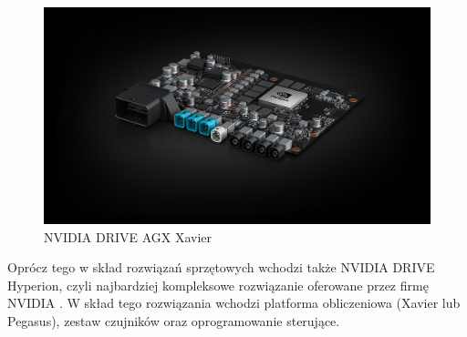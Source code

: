 \begin{enumerate*}
\begin{figure}[h]
\begin{center}
\includegraphics[width=15cm]{resources/figures/nv-drive-xavier.jpg}
\caption{NVIDIA DRIVE AGX Xavier}
\end{center}
\end{figure}
\end{enumerate*}

Oprócz tego w skład rozwiązań sprzętowych wchodzi także NVIDIA DRIVE Hyperion, czyli najbardziej kompleksowe rozwiązanie oferowane przez firmę NVIDIA \cite{nvidiaDrive:hyperion}. W skład tego rozwiązania wchodzi platforma obliczeniowa (Xavier lub Pegasus), zestaw czujników oraz oprogramowanie sterujące.


